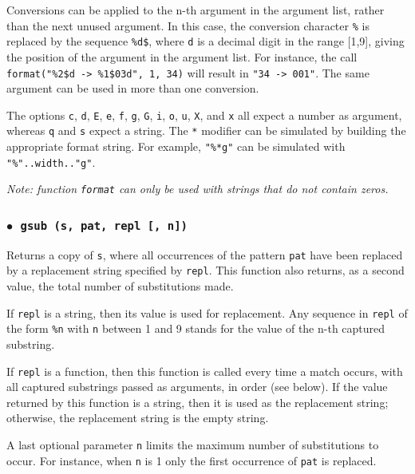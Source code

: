 \documentclass[11pt]{article}
\newcommand{\T}[1]{{\tt #1}}
\newcommand{\Deffunc}[1]{\index{#1}}
\newcommand{\ff}{$\bullet$\ }
\begin{document}
Conversions can be applied to the n-th argument in the argument list,
rather than the next unused argument.
In this case, the conversion character \verb|%| is replaced
by the sequence \verb|%d$|, where \verb|d| is a
decimal digit in the range [1,9],
giving the position of the argument in the argument list.
For instance, the call \verb|format("%2$d -> %1$03d", 1, 34)| will
result in \verb|"34 -> 001"|.
The same argument can be used in more than one conversion.

The options \verb|c|, \verb|d|, \verb|E|, \verb|e|, \verb|f|,
\verb|g|, \verb|G|, \verb|i|, \verb|o|, \verb|u|, \verb|X|, and \verb|x| all
expect a number as argument,
whereas \verb|q| and \verb|s| expect a string.
The \verb|*| modifier can be simulated by building
the appropriate format string.
For example, \verb|"%*g"| can be simulated with
\verb|"%"..width.."g"|.

\emph{Note: function \T{format} can only be used with strings that do not
contain zeros.}

\subsubsection*{\ff \T{gsub (s, pat, repl [, n])}}
\Deffunc{gsub}
Returns a copy of \verb|s|,
where all occurrences of the pattern \verb|pat| have been
replaced by a replacement string specified by \verb|repl|.
This function also returns, as a second value,
the total number of substitutions made.

If \verb|repl| is a string, then its value is used for replacement.
Any sequence in \verb|repl| of the form \verb|%n|
with \verb|n| between 1 and 9
stands for the value of the n-th captured substring.

If \verb|repl| is a function, then this function is called every time a
match occurs, with all captured substrings passed as arguments,
in order (see below).
If the value returned by this function is a string,
then it is used as the replacement string;
otherwise, the replacement string is the empty string.

A last optional parameter \verb|n| limits
the maximum number of substitutions to occur.
For instance, when \verb|n| is 1 only the first occurrence of
\verb|pat| is replaced.
\end{document}

